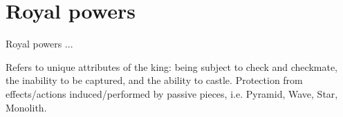 






\section*{Royal powers}

Royal powers ...

    Refers to unique attributes of the king: being subject to check and checkmate, the inability to be captured, and the ability to castle.
    Protection from effects/actions induced/performed by passive pieces, i.e. Pyramid, Wave, Star, Monolith.

